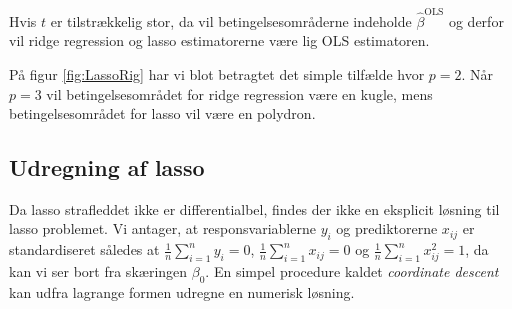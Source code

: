 Hvis $t$ er tilstrækkelig stor, da vil betingelsesområderne indeholde $\hat{\beta}^{\text{OLS}}$ og derfor vil ridge regression og lasso estimatorerne være lig OLS estimatoren.

På figur \ref{fig:LassoRig} har vi blot betragtet det simple tilfælde hvor $p=2$. Når $p=3$ vil betingelsesområdet for ridge regression være en kugle, mens betingelsesområdet for lasso vil være en polydron. 

\subsection{Udregning af lasso}
Da lasso strafleddet ikke er differentialbel, findes der ikke en eksplicit løsning til lasso problemet.
Vi antager, at responsvariablerne $y_i$ og prediktorerne $x_{ij}$ er standardiseret således at \(\frac{1}{n} \sum_{i=1}^n y_{i} = 0\), \(\frac{1}{n} \sum_{i=1}^n x_{ij} = 0\) og \(\frac{1}{n} \sum_{i=1}^n x_{ij}^2=1\), da kan vi ser bort fra skæringen $\beta_0$.
En simpel procedure kaldet \textit{coordinate descent} kan udfra lagrange formen udregne en numerisk løsning. 
%
